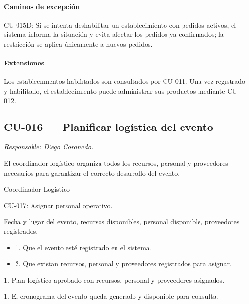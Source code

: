 \paragraph{Caminos de excepción}
CU-015D: Si se intenta deshabilitar un establecimiento con pedidos activos, el sistema informa la situación y evita afectar los pedidos ya confirmados; la restricción se aplica únicamente a nuevos pedidos.

\paragraph{Extensiones}
Los establecimientos habilitados son consultados por CU-011. Una vez registrado y habilitado, el establecimiento puede administrar sus productos mediante CU-012.

\subsection{CU-016 --- Planificar logística del evento}
\label{cu:cu-016}
\textit{Responsable: Diego Coronado.}

\begin{description}[leftmargin=!, labelwidth=3.4cm, style=nextline, topsep=3pt]
\item[Objetivo] El coordinador logístico organiza todos los recursos, personal y proveedores necesarios para garantizar el correcto desarrollo del evento.

\item[Actores] Coordinador Logístico

\item[CU relacionados] CU-017: Asignar personal operativo.

\item[Entradas] Fecha y lugar del evento, recursos disponibles, personal disponible, proveedores registrados.

\item[Pre-condiciones] \hfill
\begin{itemize}[leftmargin=1.2em, topsep=1pt]
  \item 1. Que el evento esté registrado en el sistema.
  \item 2. Que existan recursos, personal y proveedores registrados para asignar.
\end{itemize}

\item[Salidas] 1. Plan logístico aprobado con recursos, personal y proveedores asignados.

\item[Post-condiciones] 1. El cronograma del evento queda generado y disponible para consulta.

\end{description}

